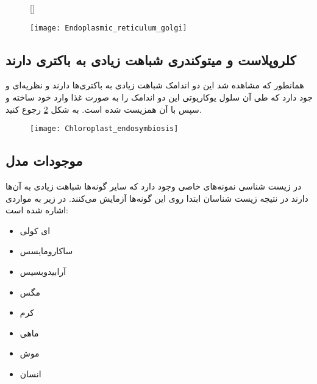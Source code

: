 \begin{description}
\begin{figure}[htbp]
	\centering
	\qquad
\end{figure} 
 
\begin{figure}[t]
	[\FBwidth]
{\caption
{
}
\label{fig:EndoplasmicReticulum}}
{\texttt{[image: Endoplasmic\_reticulum\_golgi]}}

\end{figure}  
 
\end{description}

\pagebreak
\subsection{کلروپلاست و میتوکندری شباهت زیادی به باکتری دارند}

همانطور که مشاهده شد این دو اندامک شباهت زیادی به باکتری‌ها دارند و نظریه‌ای و جود دارد که طی آن سلول یوکاریوتی این دو اندامک را به صورت غذا وارد خود ساخته و سپس با آن همزیست شده است. به شکل
\ref{figure:PrimaryEndosymbiosis}
رجوع کنید.

\begin{figure}[hbt]
	\centering
	\texttt{[image: Chloroplast\_endosymbiosis]}
	\caption{}
	\label{figure:PrimaryEndosymbiosis}
\end{figure}

\subsection{موجودات مدل}
در زیست شناسی نمونه‌های خاصی وجود دارد که سایر گونه‌ها شباهت زیادی به آن‌ها دارند در نتیجه زیست شناسان ابتدا روی این گونه‌ها آزمایش می‌کنند. در زیر به مواردی اشاره شده است:

\begin{itemize}
\item ای کولی
\item ساکارومایسس
\item آرابیدوبسیس
\item مگس
\item کرم
\item ماهی
\item موش
\item انسان
\end{itemize}

